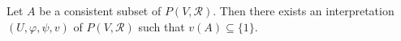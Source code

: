 Let $A$ be a consistent subset of $P(V, \mathcal{R})$. Then there exists an interpretation $(U, \varphi, \psi, v)$ of $P(V, \mathcal{R})$ such that $v(A) \subseteq \{1\}$.
